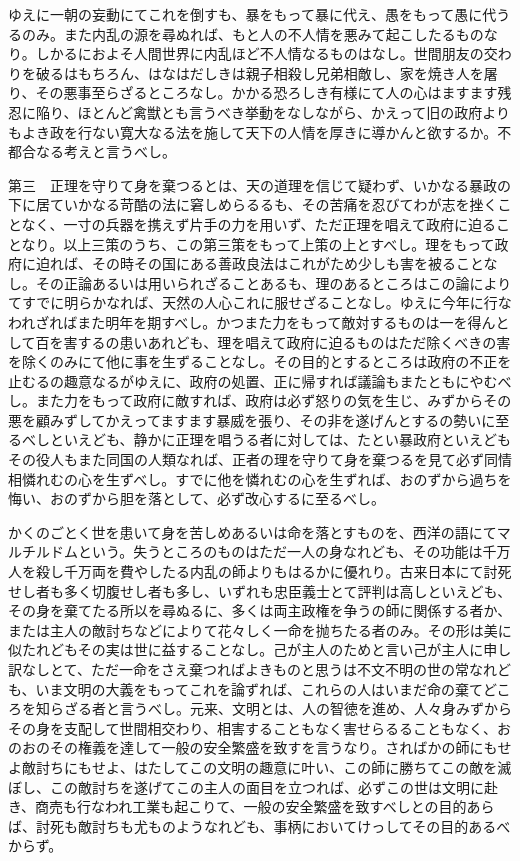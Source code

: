 \documentclass[a4paper, platex, dvipdfmx]{jsarticle}
\begin{document}
ゆえに一朝の妄動にてこれを倒すも、暴をもって暴に代え、愚をもって愚に代うるのみ。また内乱の源を尋ぬれば、もと人の不人情を悪みて起こしたるものなり。しかるにおよそ人間世界に内乱ほど不人情なるものはなし。世間朋友の交わりを破るはもちろん、はなはだしきは親子相殺し兄弟相敵し、家を焼き人を屠り、その悪事至らざるところなし。かかる恐ろしき有様にて人の心はますます残忍に陥り、ほとんど禽獣とも言うべき挙動をなしながら、かえって旧の政府よりもよき政を行ない寛大なる法を施して天下の人情を厚きに導かんと欲するか。不都合なる考えと言うべし。

第三　正理を守りて身を棄つるとは、天の道理を信じて疑わず、いかなる暴政の下に居ていかなる苛酷の法に窘しめらるるも、その苦痛を忍びてわが志を挫くことなく、一寸の兵器を携えず片手の力を用いず、ただ正理を唱えて政府に迫ることなり。以上三策のうち、この第三策をもって上策の上とすべし。理をもって政府に迫れば、その時その国にある善政良法はこれがため少しも害を被ることなし。その正論あるいは用いられざることあるも、理のあるところはこの論によりてすでに明らかなれば、天然の人心これに服せざることなし。ゆえに今年に行なわれざればまた明年を期すべし。かつまた力をもって敵対するものは一を得んとして百を害するの患いあれども、理を唱えて政府に迫るものはただ除くべきの害を除くのみにて他に事を生ずることなし。その目的とするところは政府の不正を止むるの趣意なるがゆえに、政府の処置、正に帰すれば議論もまたともにやむべし。また力をもって政府に敵すれば、政府は必ず怒りの気を生じ、みずからその悪を顧みずしてかえってますます暴威を張り、その非を遂げんとするの勢いに至るべしといえども、静かに正理を唱うる者に対しては、たとい暴政府といえどもその役人もまた同国の人類なれば、正者の理を守りて身を棄つるを見て必ず同情相憐れむの心を生ずべし。すでに他を憐れむの心を生ずれば、おのずから過ちを悔い、おのずから胆を落として、必ず改心するに至るべし。

かくのごとく世を患いて身を苦しめあるいは命を落とすものを、西洋の語にてマルチルドムという。失うところのものはただ一人の身なれども、その功能は千万人を殺し千万両を費やしたる内乱の師よりもはるかに優れり。古来日本にて討死せし者も多く切腹せし者も多し、いずれも忠臣義士とて評判は高しといえども、その身を棄てたる所以を尋ぬるに、多くは両主政権を争うの師に関係する者か、または主人の敵討ちなどによりて花々しく一命を抛ちたる者のみ。その形は美に似たれどもその実は世に益することなし。己が主人のためと言い己が主人に申し訳なしとて、ただ一命をさえ棄つればよきものと思うは不文不明の世の常なれども、いま文明の大義をもってこれを論ずれば、これらの人はいまだ命の棄てどころを知らざる者と言うべし。元来、文明とは、人の智徳を進め、人々身みずからその身を支配して世間相交わり、相害することもなく害せらるることもなく、おのおのその権義を達して一般の安全繁盛を致すを言うなり。さればかの師にもせよ敵討ちにもせよ、はたしてこの文明の趣意に叶い、この師に勝ちてこの敵を滅ぼし、この敵討ちを遂げてこの主人の面目を立つれば、必ずこの世は文明に赴き、商売も行なわれ工業も起こりて、一般の安全繁盛を致すべしとの目的あらば、討死も敵討ちも尤ものようなれども、事柄においてけっしてその目的あるべからず。
\end{document}
